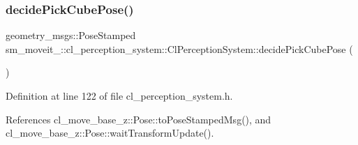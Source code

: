 \subsubsection{\texorpdfstring{decide\+Pick\+Cube\+Pose()}{decidePickCubePose()}}
{\footnotesize\ttfamily geometry\+\_\+msgs\+::\+Pose\+Stamped sm\+\_\+moveit\+\_\+::cl\+\_\+perception\+\_\+system\+::\+Cl\+Perception\+System\+::decide\+Pick\+Cube\+Pose (\begin{DoxyParamCaption}{ }\end{DoxyParamCaption})\hspace{0.3cm}{\ttfamily [inline]}}



Definition at line 122 of file cl\+\_\+perception\+\_\+system.\+h.



References cl\+\_\+move\+\_\+base\+\_\+z\+::\+Pose\+::to\+Pose\+Stamped\+Msg(), and cl\+\_\+move\+\_\+base\+\_\+z\+::\+Pose\+::wait\+Transform\+Update().



